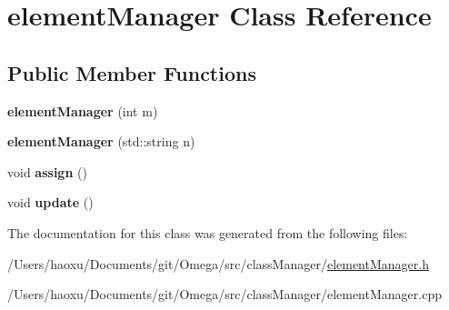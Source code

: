 \hypertarget{classelement_manager}{}\section{element\+Manager Class Reference}
\label{classelement_manager}
\subsection*{Public Member Functions}
\begin{DoxyCompactItemize}
\item 
\mbox{\label{classelement_manager_ab15c1e207de0878fc5bc547f27805df6}} 
{\bfseries element\+Manager} (int m)
\item 
\mbox{\label{classelement_manager_adb46d4ca8457958af02497fd231fd606}} 
{\bfseries element\+Manager} (std\+::string n)
\item 
\mbox{\label{classelement_manager_a9f3bb87b33a55f480bdf65804fc77af7}} 
void {\bfseries assign} ()
\item 
\mbox{\label{classelement_manager_a16cf4204e230aa2f3cc8cc7c79ab1363}} 
void {\bfseries update} ()
\end{DoxyCompactItemize}


The documentation for this class was generated from the following files\+:\begin{DoxyCompactItemize}
\item 
/\+Users/haoxu/\+Documents/git/\+Omega/src/class\+Manager/\hyperlink{element_manager_8h}{element\+Manager.\+h}\item 
/\+Users/haoxu/\+Documents/git/\+Omega/src/class\+Manager/element\+Manager.\+cpp\end{DoxyCompactItemize}
